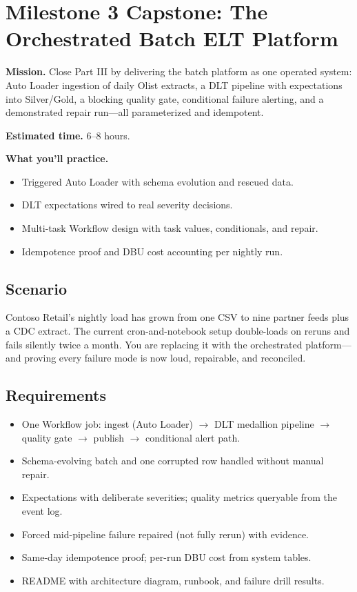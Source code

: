 \section{Milestone 3 Capstone: The Orchestrated Batch ELT Platform}\label{sec:ch12-capstone}

\begin{capstonebox}
\textbf{Mission.} Close Part III by delivering the batch platform as one operated system: Auto Loader ingestion of daily Olist extracts, a DLT pipeline with expectations into Silver/Gold, a blocking quality gate, conditional failure alerting, and a demonstrated repair run---all parameterized and idempotent.

\textbf{Estimated time.} 6--8 hours.

\textbf{What you'll practice.}
\begin{itemize}
    \item Triggered Auto Loader with schema evolution and rescued data.
    \item DLT expectations wired to real severity decisions.
    \item Multi-task Workflow design with task values, conditionals, and repair.
    \item Idempotence proof and DBU cost accounting per nightly run.
\end{itemize}
\end{capstonebox}

\subsection*{Scenario}
Contoso Retail's nightly load has grown from one CSV to nine partner feeds plus a CDC extract. The current cron-and-notebook setup double-loads on reruns and fails silently twice a month. You are replacing it with the orchestrated platform---and proving every failure mode is now loud, repairable, and reconciled.

\subsection*{Requirements}
\begin{itemize}
    \item One Workflow job: ingest (Auto Loader) $\rightarrow$ DLT medallion pipeline $\rightarrow$ quality gate $\rightarrow$ publish $\rightarrow$ conditional alert path.
    \item Schema-evolving batch and one corrupted row handled without manual repair.
    \item Expectations with deliberate severities; quality metrics queryable from the event log.
    \item Forced mid-pipeline failure repaired (not fully rerun) with evidence.
    \item Same-day idempotence proof; per-run DBU cost from system tables.
    \item README with architecture diagram, runbook, and failure drill results.
\end{itemize}

